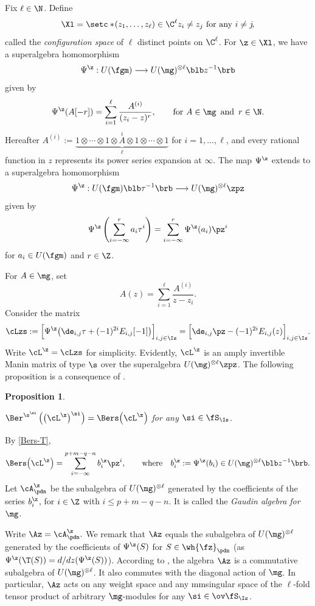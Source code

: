 \documentclass[11pt, reqno]{amsart}
\newtheorem{prop}[thm]{Proposition}
\theoremstyle{definition}
\theoremstyle{remark}
\numberwithin{equation}{section}
\begin{document}
Fix $\ell \in \N$. Define
$$
\Xl=\setc*{\! (z_1, \ldots,z_\ell)\in \C^\ell}{z_i\not=z_j \,\, \mbox{for any $i\not=j$} \!},
$$
called the \emph{configuration space} of $\ell$ distinct points on $\C^\ell$.
For $\z\in \Xl$, we have a superalgebra homomorphism
$$
 \Psi^\z :  U(\fgm)   \longrightarrow U(\mg)^{\otimes \ell} \blb z^{-1} \brb
$$
given by
 $$
  \Psi^\z(A[-r])=\sum_{i=1}^\ell \frac{A^{(i)}}{(z_i-z)^{r}}, \qquad \mbox{for $A \in \mg \,$ and $\, r \in \N$.}
 $$
 Hereafter $A^{(i)}:=\underbrace{1\otimes\cdots\otimes1\otimes \stackrel{i}{A}\otimes1\otimes\cdots\otimes1}_{\ell}$ for $i=1, \ldots, \ell$, and every rational function in $z$ represents its power series expansion at $\infty$.
The map $\Psi^\z$ extends to a superalgebra homomorphism
$$
 \Psi^\z :  U(\fgm) \blb \tau^{-1} \brb  \longrightarrow U(\mg)^{\otimes \ell} \zpz
$$
given by
 $$
 \Psi^\z  \left(\sum_{i=-\infty}^r a_i \tau^i \right)=\sum_{i=-\infty}^r \Psi^\z (a_i) \pz^i
 $$
for $a_i \in U(\fgm)$ and $r \in \Z$.


For $A \in \mg$, set
\begin{equation}\label{A(z)}
A(z)=\sum_{i=1}^\ell \frac{A^{(i)}}{z-z_i}.
\end{equation}
%
Consider the matrix
$$
\cLzs:= \Big[ \Psi^\z \big(\de_{i,j}\tau+(-1)^{2i}E_{i,j}[-1] \big)\Big]_{i,j \in \Is} =\Big[\de_{i,j}\pz-(-1)^{2i}E_{i,j}(z)\Big]_{i,j \in \Is}.
$$
Write $\cL^\z=\cLzs$ for simplicity.
Evidently, $\cL^\z$ is an amply invertible Manin matrix of type $\s$ over the superalgebra $U(\mg)^{\otimes \ell}  \zpz$.
The following proposition is a consequence of .

\begin{prop} \label{Ber-sig-L}

$\Ber^{\s^\si} \left(\big(\cL^\z\big)^\si \right)=\Bers \! \left( \cL^\z\right)$ for any $\si \in \fS_\Is$.
\end{prop}

By \eqref{Bers-T},
$$
\Bers \! \left( \cL^\z\right)=\sum_{i=-\infty}^{p+m-q-n} b_i^\z \pz^i, \qquad\mbox{where} \quad b_i^\z:= \Psi^\z (b_i) \in  U(\mg)^{\otimes \ell} \blb z^{-1} \brb.
$$
Let $\cA_\pdn^\z$ be the subalgebra of $U(\mg)^{\otimes \ell}$ generated by the coefficients of the series $b_i^\z$, for $i \in \Z$ with $i \le p+m-q-n$.
It is called the \emph{Gaudin algebra for $\mg$}.


Write
$
\Az=\cA_\pdn^\z.
$
We remark that $\Az$ equals the subalgebra of $U(\mg)^{\otimes \ell}$ generated by the coefficients of $\Psi^\z(S)$ for $S \in \wh{\fz}_\pdn$ (as $\Psi^\z ( \T(S) )=d/dz ( \Psi^\z(S))$).
According to \cite[Corallary 3.6]{MR}, the algebra $\Az$ is a commutative subalgebra of $U(\mg)^{\otimes \ell}$.
It also commutes with the diagonal action of $\mg$.
In particular, $\Az$ acts on any weight space and any $\si\mm$singular space of the $\ell$-fold tensor product of arbitrary $\mg$-modules for any $\si \in \ov\fS_\Is$.
\end{document}

